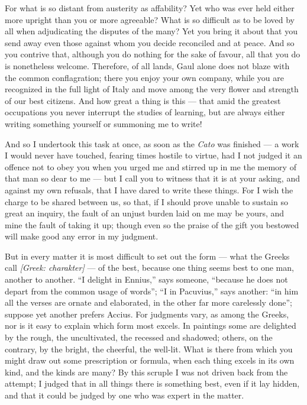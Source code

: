  For what is so distant from austerity as affability? Yet who was ever held either more upright than you or more agreeable? What is so difficult as to be loved by all when adjudicating the disputes of the many? Yet you bring it about that you send away even those against whom you decide reconciled and at peace. And so you contrive that, although you do nothing for the sake of favour, all that you do is nonetheless welcome. Therefore, of all lands, Gaul alone does not blaze with the common conflagration; there you enjoy your own company, while you are recognized in the full light of Italy and move among the very flower and strength of our best citizens. And how great a thing is this — that amid the greatest occupations you never interrupt the studies of learning, but are always either writing something yourself or summoning me to write!

 And so I undertook this task at once, as soon as the \textit{Cato} was finished — a work I would never have touched, fearing times hostile to virtue, had I not judged it an offence not to obey you when you urged me and stirred up in me the memory of that man so dear to me — but I call you to witness that it is at your asking, and against my own refusals, that I have dared to write these things. For I wish the charge to be shared between us, so that, if I should prove unable to sustain so great an inquiry, the fault of an unjust burden laid on me may be yours, and mine the fault of taking it up; though even so the praise of the gift you bestowed will make good any error in my judgment.

 But in every matter it is most difficult to set out the form — what the Greeks call \textit{[Greek: charakter]} — of the best, because one thing seems best to one man, another to another. ``I delight in Ennius,'' says someone, ``because he does not depart from the common usage of words''; ``I in Pacuvius,'' says another: ``in him all the verses are ornate and elaborated, in the other far more carelessly done''; suppose yet another prefers Accius. For judgments vary, as among the Greeks, nor is it easy to explain which form most excels. In paintings some are delighted by the rough, the uncultivated, the recessed and shadowed; others, on the contrary, by the bright, the cheerful, the well-lit. What is there from which you might draw out some prescription or formula, when each thing excels in its own kind, and the kinds are many? By this scruple I was not driven back from the attempt; I judged that in all things there is something best, even if it lay hidden, and that it could be judged by one who was expert in the matter.

